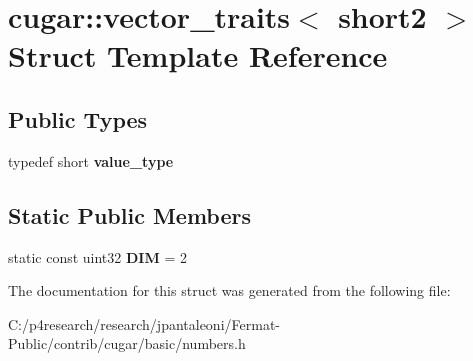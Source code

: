 \hypertarget{structcugar_1_1vector__traits_3_01short2_01_4}{}\section{cugar\+:\+:vector\+\_\+traits$<$ short2 $>$ Struct Template Reference}
\label{structcugar_1_1vector__traits_3_01short2_01_4}
\subsection*{Public Types}
\begin{DoxyCompactItemize}
\item 
\mbox{\label{structcugar_1_1vector__traits_3_01short2_01_4_a61b71f5bc3488d067589a15c9e3531c4}} 
typedef short {\bfseries value\+\_\+type}
\end{DoxyCompactItemize}
\subsection*{Static Public Members}
\begin{DoxyCompactItemize}
\item 
\mbox{\label{structcugar_1_1vector__traits_3_01short2_01_4_afd9e89c24ed04690ce37214164fc0be2}} 
static const uint32 {\bfseries D\+IM} = 2
\end{DoxyCompactItemize}


The documentation for this struct was generated from the following file\+:\begin{DoxyCompactItemize}
\item 
C\+:/p4research/research/jpantaleoni/\+Fermat-\/\+Public/contrib/cugar/basic/numbers.\+h\end{DoxyCompactItemize}
